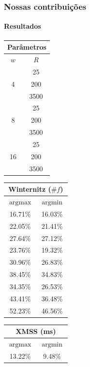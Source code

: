 \documentclass[12pt]{beamer}
\DeclareMathOperator*{\argmin}{argmin}
\DeclareMathOperator*{\argmax}{argmax}
\begin{document}
\begin{frame}
  \frametitle{Nossas contribuições}
  \framesubtitle{Resultados}
  \small
  \begin{table}
    \begin{tabular}{c|c}
      \multicolumn{2}{c}{Parâmetros} \\
      \toprule
      $w$ &                 $R$     \\
      \midrule
      \multirow{3}{*}{4}    & 25    \\
                            & 200   \\
                            & 3500  \\
      \midrule
      \multirow{3}{*}{8}    & 25    \\
                            & 200   \\
                            & 3500  \\
      \midrule
      \multirow{3}{*}{16}   & 25    \\
                            & 200   \\
                            & 3500  \\
      \bottomrule
    \end{tabular}
    \begin{tabular}{c|c}
      \multicolumn{2}{c}{Winternitz ($\# f$)} \\
      \toprule
      $\argmax{}$   & $\argmin{}$   \\
      \midrule
      16.71\%       & 16.03\%       \\
      22.05\%       & 21.41\%       \\
      27.64\%       & 27.12\%       \\
      \midrule
      23.76\%       & 19.32\%       \\
      30.96\%       & 26.83\%       \\
      38.45\%       & 34.83\%       \\
      \midrule
      34.35\%       & 26.53\%       \\
      43.41\%       & 36.48\%       \\
      52.23\%       & 46.56\%       \\
      \bottomrule
    \end{tabular}
    \begin{tabular}{c|c}
      \multicolumn{2}{c}{XMSS (ms)} \\
      \toprule
      $\argmax{}$   & $\argmin{}$   \\
      \midrule
      13.22\%       &  9.48\%       \\

\end{tabular}
\end{table}
\end{frame}
\end{document}
